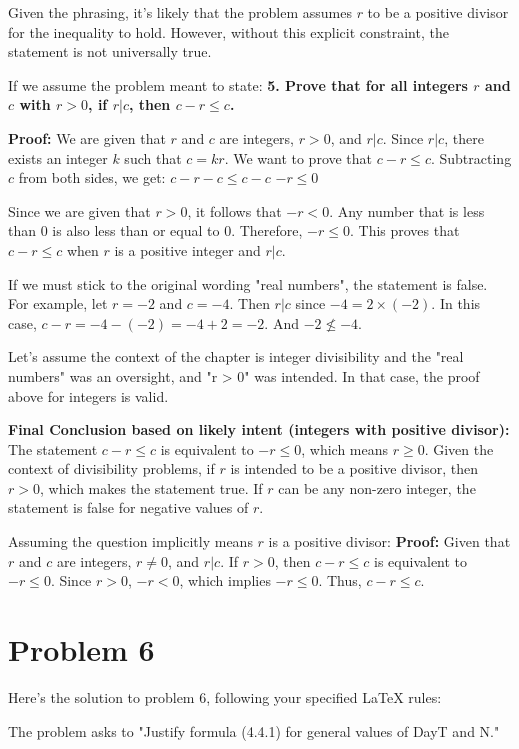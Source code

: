 \documentclass{article}
\begin{document}
Given the phrasing, it's likely that the problem assumes $r$ to be a positive divisor for the inequality to hold. However, without this explicit constraint, the statement is not universally true.

If we assume the problem meant to state:
\textbf{5. Prove that for all integers $r$ and $c$ with $r > 0$, if $r | c$, then $c-r \leq c$.}

\textbf{Proof:}
We are given that $r$ and $c$ are integers, $r > 0$, and $r | c$.
Since $r | c$, there exists an integer $k$ such that $c = kr$.
We want to prove that $c - r \leq c$.
Subtracting $c$ from both sides, we get:
$c - r - c \leq c - c$
$-r \leq 0$

Since we are given that $r > 0$, it follows that $-r < 0$.
Any number that is less than 0 is also less than or equal to 0.
Therefore, $-r \leq 0$.
This proves that $c - r \leq c$ when $r$ is a positive integer and $r | c$.

If we must stick to the original wording "real numbers", the statement is false. For example, let $r = -2$ and $c = -4$. Then $r|c$ since $-4 = 2 \times (-2)$. In this case, $c - r = -4 - (-2) = -4 + 2 = -2$. And $-2 \not\leq -4$.

Let's assume the context of the chapter is integer divisibility and the "real numbers" was an oversight, and "r > 0" was intended. In that case, the proof above for integers is valid.

\textbf{Final Conclusion based on likely intent (integers with positive divisor):}
The statement $c-r \leq c$ is equivalent to $-r \leq 0$, which means $r \geq 0$. Given the context of divisibility problems, if $r$ is intended to be a positive divisor, then $r > 0$, which makes the statement true. If $r$ can be any non-zero integer, the statement is false for negative values of $r$.

Assuming the question implicitly means $r$ is a positive divisor:
\textbf{Proof:}
Given that $r$ and $c$ are integers, $r \neq 0$, and $r | c$.
If $r > 0$, then $c - r \leq c$ is equivalent to $-r \leq 0$.
Since $r > 0$, $-r < 0$, which implies $-r \leq 0$.
Thus, $c - r \leq c$.

\newpage

\section*{\textbf{Problem 6}}
Here's the solution to problem 6, following your specified LaTeX rules:

The problem asks to "Justify formula (4.4.1) for general values of DayT and N."
\end{document}
